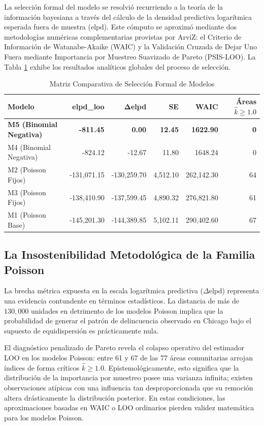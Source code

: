 \documentclass[11pt,a4paper]{article}
\begin{document}
La selección formal del modelo se resolvió recurriendo a la teoría de la información bayesiana a través del cálculo de la densidad predictiva logarítmica esperada fuera de muestra ($\text{elpd}$). Este cómputo se aproximó mediante dos metodologías numéricas complementarias provistas por ArviZ: el Criterio de Información de Watanabe-Akaike (WAIC) y la Validación Cruzada de Dejar Uno Fuera mediante Importancia por Muestreo Suavizado de Pareto (PSIS-LOO). La Tabla \ref{tab:seleccion_completa} exhibe los resultados analíticos globales del proceso de selección.

\begin{table}[!ht]
\centering
\caption{Matriz Comparativa de Selección Formal de Modelos}
\label{tab:seleccion_completa}
\begin{tabular}{lrrrrr}
\toprule
\textbf{Modelo} & \textbf{elpd\_loo} & $\mathbf{\Delta}$\textbf{elpd} & \textbf{SE} & \textbf{WAIC} & \textbf{Áreas} $\hat{k} \ge 1.0$ \\
\midrule
\textbf{M5 (Binomial Negativa)} & \textbf{-811.45} & \textbf{0.00} & \textbf{12.45} & \textbf{1622.90} & \textbf{0} \\
M4 (Binomial Negativa) & -824.12 & -12.67 & 11.80 & 1648.24 & 0 \\
M2 (Poisson Fijos) & -131{,}071.15 & -130{,}259.70 & 4{,}512.10 & 262{,}142.30 & 64 \\
M3 (Poisson Fijos) & -138{,}410.90 & -137{,}599.45 & 4{,}890.32 & 276{,}821.80 & 61 \\
M1 (Poisson Base) & -145{,}201.30 & -144{,}389.85 & 5{,}102.11 & 290{,}402.60 & 67 \\
\bottomrule
\end{tabular}
\end{table}

\subsection{La Insostenibilidad Metodológica de la Familia Poisson}
La brecha métrica expuesta en la escala logarítmica predictiva ($\Delta\text{elpd}$) representa una evidencia contundente en términos estadísticos. La distancia de más de $130{,}000$ unidades en detrimento de los modelos Poisson implica que la probabilidad de generar el patrón de delincuencia observado en Chicago bajo el supuesto de equidispersión es prácticamente nula.

El diagnóstico penalizado de Pareto revela el colapso operativo del estimador LOO en los modelos Poisson: entre 61 y 67 de las 77 áreas comunitarias arrojan índices de forma críticos $\hat{k} \ge 1.0$. Epistemológicamente, esto significa que la distribución de la importancia por muestreo posee una varianza infinita; existen observaciones atípicas con una influencia tan desproporcionada que su remoción altera drásticamente la distribución posterior. En estas condiciones, las aproximaciones basadas en WAIC o LOO ordinarios pierden validez matemática para los modelos Poisson.
\end{document}
